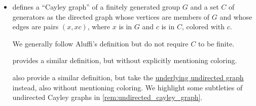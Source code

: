 \begin{remark}
\begin{itemize}
    They define both colors and uncolored, as well as directed and undirected Cayley graphs. For directed graphs of groups the color can be determined from the arc, but not in general, so here it makes sense to explicitly label an arc with a color.

    We use a mixture of their two definitions for the case of finitely generated groups.

    Later, in \cite[def. 7.3.2]{Knauer2019AlgebraicGraphTheory}, they define a \enquote{K\"onig graph} of an arbitrary group \( G \) and a generating subset \( C \) that is closed under inverses.

    \textcite[def. 5.4.3]{Steinberg2012RepresentationTheory} calls a \enquote{Cayley graph} what Knauer call a \enquote{K\"onig graph}, but restricted to finite groups, and with the condition that the neutral element is not in \( C \).

    \item \Textcite[exerc. II.8.6]{Aluffi2009Algebra} defines a \enquote{Cayley graph} of a finitely generated group \( G \) and a set \( C \) of generators as the directed graph whose vertices are members of \( G \) and whose edges are pairs \( (x, xc) \), where \( x \) is in \( G \) and \( c \) is in \( C \), colored with \( c \).

    We generally follow Aluffi's definition but do not require \( C \) to be finite.

    \textcite[18]{Rotman2017AdvancedModernAlgebraPart2} provides a similar definition, but without explicitly mentioning coloring.

    \textcite[def. 2.1.3]{HadelerMüller2017CellularAutomata} also provide a similar definition, but take the \hyperref[def:multigraph_orientation]{underlying undirected graph} instead, also without mentioning coloring. We highlight some subtleties of undirected Cayley graphs in \cref{rem:undirected_cayley_graph}.
  \end{itemize}
\end{remark}

